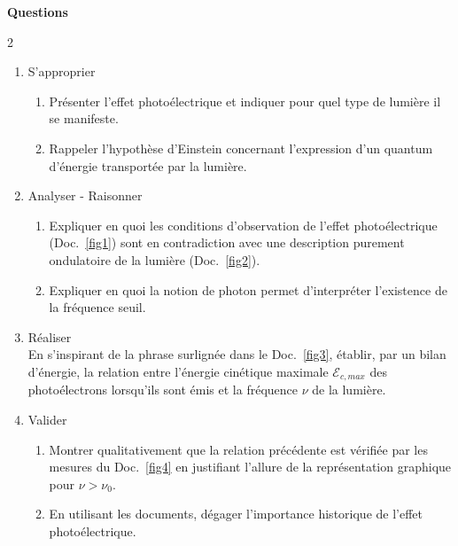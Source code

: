 \documentclass[a4paper,11pt,fleqn]{scrartcl}%
\begin{document}
\noindent \colorbox{blue!10}{
\begin{minipage}{\linewidth}
\centering  \textcolor{purple!50!blue!70}{\Large \textbf{Questions}}
\begin{multicols}{2}
\begin{enumerate}
	\item S’approprier
	\begin{enumerate}
		\item Présenter l’effet photoélectrique et indiquer pour quel type de lumière il se manifeste.
		\item Rappeler l’hypothèse d’Einstein concernant l’expression d’un quantum d’énergie transportée par la lumière.
	\end{enumerate}
	\item Analyser - Raisonner
	\begin{enumerate}
		\item Expliquer en quoi les conditions d’observation de l’effet photoélectrique (Doc.~\ref{fig1}) sont en contradiction avec une description purement ondulatoire de la lumière (Doc.~\ref{fig2}).
		\item Expliquer en quoi la notion de photon permet d’interpréter l’existence de la fréquence seuil.
	\end{enumerate}
	\item Réaliser\\
	En s’inspirant de la phrase surlignée dans le Doc.~\ref{fig3}, établir, par un bilan d’énergie, la relation entre l’énergie cinétique maximale $\mathcal{E}_{c,max}$ des photoélectrons lorsqu’ils sont émis et la fréquence $\nu$ de la lumière.
	\item Valider
	\begin{enumerate}
		\item Montrer qualitativement que la relation précédente est vérifiée par les mesures du Doc.~\ref{fig4} en justifiant l’allure de la représentation graphique pour $\nu >\nu_0$.
		\item En utilisant les documents, dégager l’importance historique de l’effet photoélectrique.
	\end{enumerate}

\end{enumerate}
\end{multicols}
\end{minipage}
}
 
\end{document}
